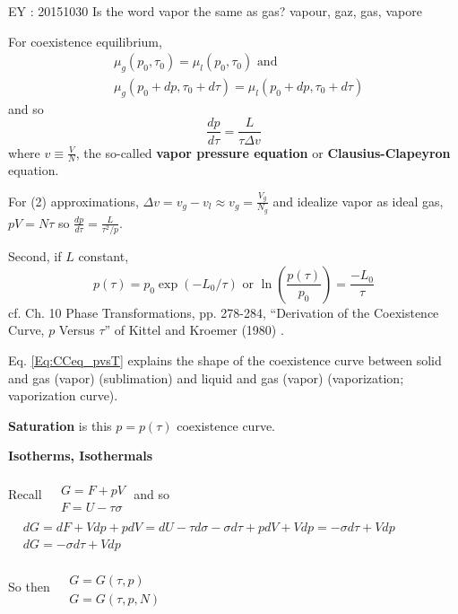 \documentclass[10pt]{amsart}
\begin{document}
\begin{multicols*}{2}
EY : 20151030 Is the word vapor the same as gas?  vapour, gaz, gas, vapore

For coexistence equilibrium, 
\[
\begin{aligned}
  & \mu_g(p_0,\tau_0) = \mu_l(p_0,\tau_0) \text{ and } \\ 
  & \mu_g(p_0 + dp, \tau_0+d\tau) = \mu_l(p_0 + dp, \tau_0+d\tau)
\end{aligned}
\]
and so 
\begin{equation}
  \frac{dp}{d\tau} = \frac{L}{\tau \Delta v}
\end{equation}
where $v\equiv \frac{V}{N}$, the so-called \textbf{vapor pressure equation} or \textbf{Clausius-Clapeyron} equation.  

For (2) approximations, $\Delta v = v_g - v_l \approx v_g = \frac{V_g}{N_g}$ and idealize vapor as ideal gas, $pV = N\tau$ so $\frac{dp}{d\tau} = \frac{L}{\tau^2/p}$.  

Second, if $L$ constant, 
\begin{equation}\label{Eq:CCeq_pvsT}
  p(\tau) = p_0 \exp{ (-L_0/\tau)} \text{ or } \ln{ \left( \frac{p(\tau)}{p_0} \right) } = \frac{-L_0}{\tau}
\end{equation}
cf. Ch. 10 Phase Transformations, pp. 278-284, ``Derivation of the Coexistence Curve, $p$ Versus $\tau$'' of Kittel and Kroemer (1980) \cite{CKittelHKroemer1980}.  

Eq. \ref{Eq:CCeq_pvsT} explains the shape of the coexistence curve between solid and gas (vapor) (sublimation) and liquid and gas (vapor) (vaporization; vaporization curve).  

\textbf{Saturation} is this $p=p(\tau)$ coexistence curve.  


\textbf{Isotherms, Isothermals}

Recall $\begin{aligned} 
  & \quad \\
  & G = F + pV \\
  & F = U-\tau \sigma \end{aligned}$ and so $\begin{aligned}
  & \quad \\
  & dG = dF + Vdp + pdV = dU - \tau d\sigma - \sigma d\tau + pdV + Vdp = -\sigma d\tau + Vdp \\
  & dG = -\sigma d\tau + Vdp \end{aligned}$

So then $\begin{aligned} & \quad \\
  & G = G(\tau, p) \\
  & G= G(\tau, p, N) \end{aligned}$ 


\end{multicols*}
\end{document}
